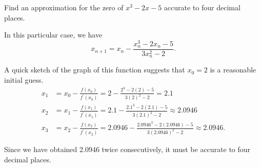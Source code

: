 \begin{example}
	Find an approximation for the zero of $x^3-2x-5$ accurate to four decimal places.
\end{example}
\begin{answer}
	In this particular case, we have
	\begin{equation*}
		x_{n+1} = x_{n} - \frac{x^3_n - 2x_n - 5}{3x^2_n - 2}.
	\end{equation*}
	
	A quick sketch of the graph of this function suggests that $x_0=2$ is a reasonable initial guess.
	\begin{align*}
		x_1 &= x_0 - \frac{f(x_0)}{f^\prime(x_0)} = 2 - \frac{2^3 - 2(2) - 5}{3(2)^2 - 2} = 2.1 \\
		x_2 &= x_1 - \frac{f(x_1)}{f^\prime(x_1)} = 2.1 - \frac{2.1^3 - 2(2.1) - 5}{3(2.1)^2 - 2} \approx 2.0946 \\
		x_3 &= x_2 - \frac{f(x_2)}{f^\prime(x_2)} = 2.0946 - \frac{2.0946^3 - 2(2.0946) - 5}{3(2.0946)^2 - 2} \approx 2.0946.
	\end{align*}
	
	Since we have obtained 2.0946 twice consecutively, it must be accurate to four decimal places.
\end{answer}